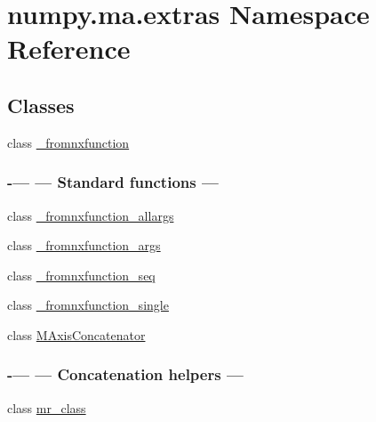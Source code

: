 \hypertarget{namespacenumpy_1_1ma_1_1extras}{}\section{numpy.\+ma.\+extras Namespace Reference}
\label{namespacenumpy_1_1ma_1_1extras}
\subsection*{Classes}
\begin{DoxyCompactItemize}
\item 
class \hyperlink{classnumpy_1_1ma_1_1extras_1_1__fromnxfunction}{\+\_\+fromnxfunction}
\begin{DoxyCompactList}\small\item\em 

 \subsubsection*{-\/--- --- Standard functions --- }\end{DoxyCompactList}\item 
class \hyperlink{classnumpy_1_1ma_1_1extras_1_1__fromnxfunction__allargs}{\+\_\+fromnxfunction\+\_\+allargs}
\item 
class \hyperlink{classnumpy_1_1ma_1_1extras_1_1__fromnxfunction__args}{\+\_\+fromnxfunction\+\_\+args}
\item 
class \hyperlink{classnumpy_1_1ma_1_1extras_1_1__fromnxfunction__seq}{\+\_\+fromnxfunction\+\_\+seq}
\item 
class \hyperlink{classnumpy_1_1ma_1_1extras_1_1__fromnxfunction__single}{\+\_\+fromnxfunction\+\_\+single}
\item 
class \hyperlink{classnumpy_1_1ma_1_1extras_1_1MAxisConcatenator}{M\+Axis\+Concatenator}
\begin{DoxyCompactList}\small\item\em 

 \subsubsection*{-\/--- --- Concatenation helpers --- }\end{DoxyCompactList}\item 
class \hyperlink{classnumpy_1_1ma_1_1extras_1_1mr__class}{mr\+\_\+class}
\end{DoxyCompactItemize}
